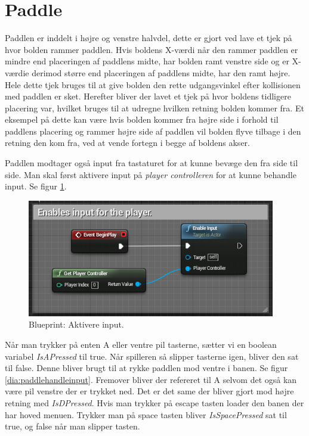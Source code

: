 \section{Paddle}
Paddlen er inddelt i højre og venstre halvdel, dette er gjort ved lave et tjek på hvor bolden rammer paddlen. Hvis boldens X-værdi når den rammer paddlen er mindre end placeringen af paddlens midte, har bolden ramt venstre side og er X-værdie derimod større end placeringen af paddlens midte, har den ramt højre. Hele dette tjek bruges til at give bolden den rette udgangsvinkel efter kollisionen med paddlen er sket. Herefter bliver der lavet et tjek på hvor boldens tidligere placering var, hvilket bruges til at udregne hvilken retning bolden kommer fra. Et eksempel på dette kan være hvis bolden kommer fra højre side i forhold til paddlens placering og rammer højre side af paddlen vil bolden flyve tilbage i den retning den kom fra, ved at vende fortegn i begge af boldens akser.

Paddlen modtager også input fra tastaturet for at kunne bevæge den fra side til side. Man skal først aktivere input på \textit{player controlleren} for at kunne behandle input. Se figur \ref{dia:paddleenableinput}. 

\begin{figure}
	\begin{center}
		\caption{Blueprint: Aktivere input.}
		\label{dia:paddleenableinput}
		\includegraphics[width=0.60\linewidth]{pictures/blueprints/paddle-enable-input}
		\end{center}
\end{figure}

Når man trykker på enten A eller ventre pil tasterne, sætter vi en boolean variabel \textit{IsAPressed} til true. Når spilleren så slipper tasterne igen, bliver den sat til false. Denne bliver brugt til at rykke paddlen mod ventre i banen. Se figur \ref{dia:paddlehandleinput}. Fremover bliver der refereret til A selvom det også kan være pil venstre der er trykket ned. Det er det same der bliver gjort mod højre retning med \textit{IsDPressed}. Hvis man trykker på escape tasten loader den banen der har hoved menuen. Trykker man på space tasten bliver \textit{IsSpacePressed} sat til true, og false når man slipper tasten.

